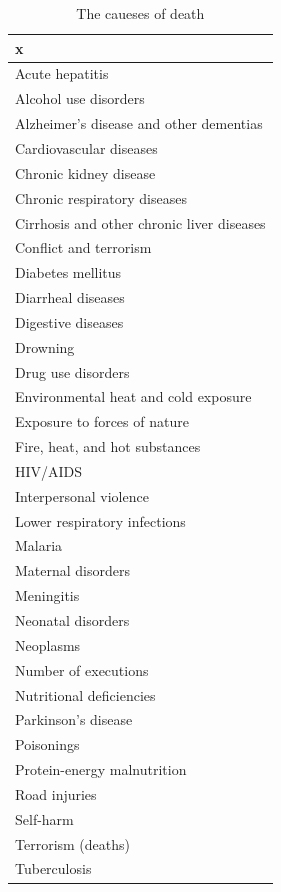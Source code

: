 \documentclass[11pt,a4paper,]{article}
\begin{document}
\begin{table}

\caption{\label{tab:deathcauses}The caueses of death}
\centering
\begin{tabular}[t]{l}
\hline
x\\
\hline
Acute hepatitis\\
\hline
Alcohol use disorders\\
\hline
Alzheimer's disease and other dementias\\
\hline
Cardiovascular diseases\\
\hline
Chronic kidney disease\\
\hline
Chronic respiratory diseases\\
\hline
Cirrhosis and other chronic liver diseases\\
\hline
Conflict and terrorism\\
\hline
Diabetes mellitus\\
\hline
Diarrheal diseases\\
\hline
Digestive diseases\\
\hline
Drowning\\
\hline
Drug use disorders\\
\hline
Environmental heat and cold exposure\\
\hline
Exposure to forces of nature\\
\hline
Fire, heat, and hot substances\\
\hline
HIV/AIDS\\
\hline
Interpersonal violence\\
\hline
Lower respiratory infections\\
\hline
Malaria\\
\hline
Maternal disorders\\
\hline
Meningitis\\
\hline
Neonatal disorders\\
\hline
Neoplasms\\
\hline
Number of executions\\
\hline
Nutritional deficiencies\\
\hline
Parkinson's disease\\
\hline
Poisonings\\
\hline
Protein-energy malnutrition\\
\hline
Road injuries\\
\hline
Self-harm\\
\hline
Terrorism (deaths)\\
\hline
Tuberculosis\\
\hline
\end{tabular}
\end{table}
\end{document}
